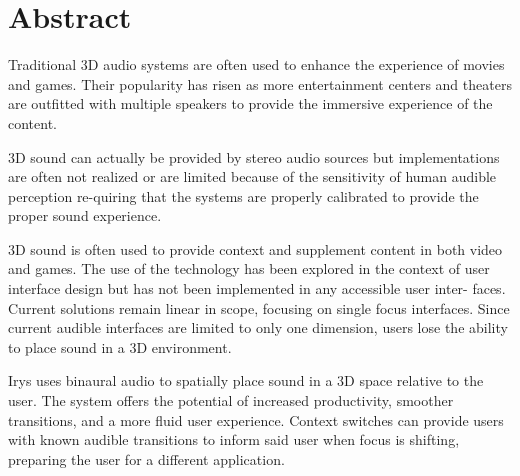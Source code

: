 \newpage
\chapter{Abstract}

Traditional 3D audio systems are often used to enhance the experience of movies
and games. Their popularity has risen as more entertainment centers and
theaters are outfitted with multiple speakers to provide the immersive
experience of the content.

3D sound can actually be provided by stereo audio sources but implementations
are often not realized or are limited because of the sensitivity of human
audible perception re-quiring that the systems are properly calibrated to
provide the proper sound experience.

3D sound is often used to provide context and supplement content in both video
and games. The use of the technology has been explored in the context of user
interface design but has not been implemented in any accessible user inter-
faces. Current solutions remain linear in scope, focusing on single focus
interfaces.  Since current audible interfaces are limited to only one dimension,
users lose the ability to place sound in a 3D environment.

Irys uses binaural audio to spatially place sound in a 3D space relative to the
user. The system offers the potential of increased productivity, smoother
transitions, and a more fluid user experience.  Context switches can provide
users with known audible transitions to inform said user when focus is shifting,
preparing the user for a different application.


